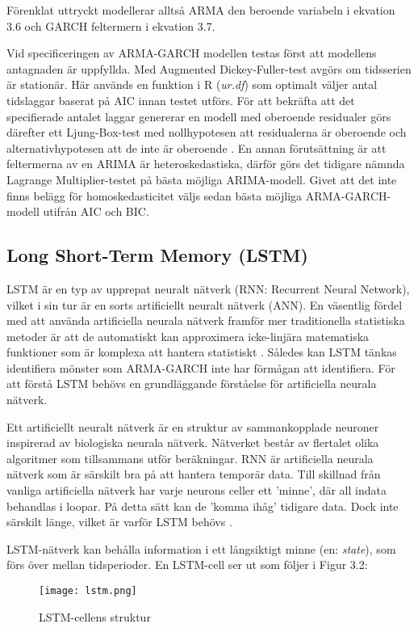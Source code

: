 \documentclass[11pt]{article}
\numberwithin{equation}{section}
\numberwithin{table}{section}
\numberwithin{figure}{section}
\begin{document}
Förenklat uttryckt modellerar alltså ARMA den beroende variabeln i ekvation 3.6 och GARCH feltermern i ekvation 3.7. 

Vid specificeringen av ARMA-GARCH modellen testas först att modellens antagnaden är uppfyllda. Med Augmented Dickey-Fuller-test avgörs om tidsserien är stationär. Här används en funktion  i R (\textit{ur.df}) som optimalt väljer antal tidslaggar baserat på AIC innan testet utförs.  För att bekräfta att det specifierade antalet laggar genererar en modell med oberoende residualer görs därefter ett Ljung-Box-test med nollhypotesen att residualerna är oberoende och alternativhypotesen att de inte är oberoende \parencite{box1970distribution}. En annan förutsättning är att feltermerna av en ARIMA är heteroskedastiska, därför görs det tidigare nämnda Lagrange Multiplier-testet på bästa möjliga ARIMA-modell. Givet att det inte finns belägg för homoskedasticitet väljs sedan bästa möjliga ARMA-GARCH-modell utifrån AIC och BIC. 


\subsection{Long Short-Term Memory (LSTM)}
LSTM är en typ av upprepat neuralt nätverk (RNN: Recurrent Neural Network), vilket i sin tur är en sorts artificiellt neuralt nätverk (ANN). En väsentlig fördel med att använda artificiella neurala nätverk framför mer traditionella statistiska metoder är att de automatiskt kan approximera icke-linjära matematiska funktioner som är komplexa att hantera statistiskt \parencite{paliwal2009neural}. Således kan LSTM tänkas identifiera mönster som ARMA-GARCH inte har förmågan att identifiera.  För att förstå LSTM behövs en grundläggande förståelse för artificiella neurala nätverk. 

Ett artificiellt neuralt nätverk är en struktur av sammankopplade neuroner inspirerad av biologiska neurala nätverk. Nätverket består av flertalet olika algoritmer som tillsammans utför beräkningar. RNN är artificiella neurala nätverk som är särskilt bra på att hantera temporär data. Till skillnad från vanliga artificiella nätverk har varje neurons celler ett 'minne', där all indata behandlas i loopar. På detta sätt kan de 'komma ihåg' tidigare data. Dock inte särskilt länge, vilket är varför LSTM behövs \parencite[][,s.478-559]{purkait2019hands}. 

LSTM-nätverk kan behålla information i ett långsiktigt minne (en: \textit{state}), som förs över mellan tidsperioder. En LSTM-cell ser ut som följer i Figur 3.2:
\begin{figure}[H]
\caption{LSTM-cellens struktur \parencite[lånad från][]{yuan2019nonlinear}}
\texttt{[image: lstm.png]}
\centering
\end{figure}
\end{document}
